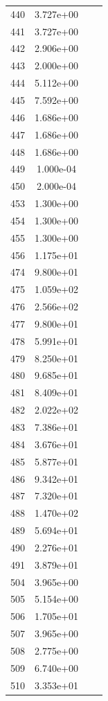 \documentclass[12pt]{article}
\begin{document}
\begin{longtable}{@{}cccc@{}}
440 & 3.727e+00 &  &  \\
441 & 3.727e+00 &  &  \\
442 & 2.906e+00 &  &  \\
443 & 2.000e+00 &  &  \\
444 & 5.112e+00 &  &  \\
445 & 7.592e+00 &  &  \\
446 & 1.686e+00 &  &  \\
447 & 1.686e+00 &  &  \\
448 & 1.686e+00 &  &  \\
449 & 1.000e-04 &  &  \\
450 & 2.000e-04 &  &  \\
453 & 1.300e+00 &  &  \\
454 & 1.300e+00 &  &  \\
455 & 1.300e+00 &  &  \\
456 & 1.175e+01 &  &  \\
474 & 9.800e+01 &  &  \\
475 & 1.059e+02 &  &  \\
476 & 2.566e+02 &  &  \\
477 & 9.800e+01 &  &  \\
478 & 5.991e+01 &  &  \\
479 & 8.250e+01 &  &  \\
480 & 9.685e+01 &  &  \\
481 & 8.409e+01 &  &  \\
482 & 2.022e+02 &  &  \\
483 & 7.386e+01 &  &  \\
484 & 3.676e+01 &  &  \\
485 & 5.877e+01 &  &  \\
486 & 9.342e+01 &  &  \\
487 & 7.320e+01 &  &  \\
488 & 1.470e+02 &  &  \\
489 & 5.694e+01 &  &  \\
490 & 2.276e+01 &  &  \\
491 & 3.879e+01 &  &  \\
504 & 3.965e+00 &  &  \\
505 & 5.154e+00 &  &  \\
506 & 1.705e+01 &  &  \\
507 & 3.965e+00 &  &  \\
508 & 2.775e+00 &  &  \\
509 & 6.740e+00 &  &  \\
510 & 3.353e+01 &  &  \\

\end{longtable}
\end{document}
